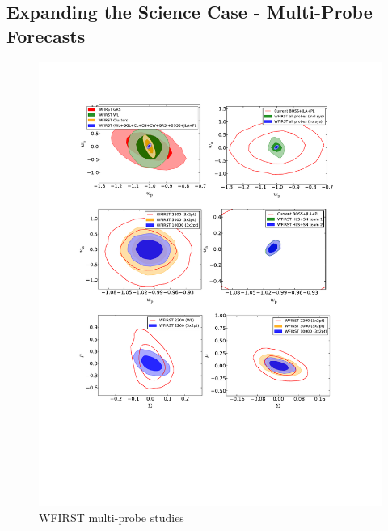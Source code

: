 \subsection{Expanding the Science Case - Multi-Probe Forecasts}

\label{sec:multi-probe}
\begin{figure}
\includegraphics[width=15cm]{Plots/forecasts/multi}
\caption{WFIRST multi-probe studies}
         \label{fi:multi}
\end{figure}

